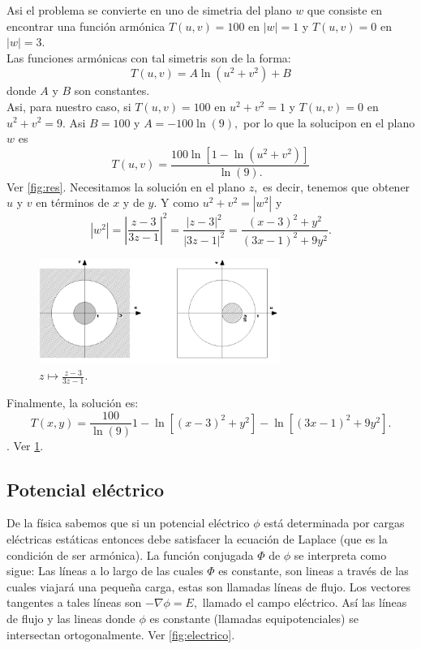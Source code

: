 \documentclass[a4paper]{article}
\begin{document}
Asi el problema se convierte en uno de simetria del plano $w$ que consiste en encontrar una función armónica $T(u,v)=100$ en $|w|=1$ y $T(u,v)=0$ en $|w|=3.$\\
Las funciones armónicas con tal simetris son de la forma: $$
T(u,v)=A\ln(u^{2}+v^{2})+B
$$ donde $A$ y $B$ son constantes.\\
Asi, para nuestro caso, si $T(u,v)=100$ en $u^{2}+v^{2}=1$ y $T(u,v)=0$ en $u^{2}+v^{2}=9.$ Asi $B=100$ y $A=-100 \ln(9),$ por lo que la solucipon en el plano $w$ es $$
T(u,v)=\frac{100 \ln[1-\ln(u^{2}+v^{2})]}{\ln(9).}
$$ Ver \ref{fig:res}.
Necesitamos la solución en el plano $z,$ es decir, tenemos que obtener $u$ y $v$ en términos de $x$ y de $y.$ Y como $u^{2}+v^{2}=|w^{2}|$ y $$
|w^{2}|=|\frac{z-3}{3z-1}|^{2}
=\frac{|z-3|^{2}}{|3z-1|^{2}}
=\frac{(x-3)^{2}+y^{2}}{(3x-1)^{2}+9y^{2}}.
$$
\begin{figure}
\centering
\includegraphics[width=0.7\textwidth]{fig4.png}
\caption{\label{fig:fig2} $z\mapsto \frac{z-3}{3z-1}$.}
\end{figure}

Finalmente, la solución es:$$
T(x,y)=\frac{100}{\ln(9)} {1-\ln[(x-3)^{2}+y^{2}]-\ln[(3x-1)^{2}+9y^{2}]}.
$$. Ver \ref{fig:fig2}. \\

\subsection{Potencial eléctrico}
De la física sabemos que si un potencial eléctrico $\phi$ está determinada por cargas eléctricas estáticas entonces debe satisfacer la ecuación de Laplace (que es la condición de ser armónica). La función conjugada $\Phi$ de $\phi$ se interpreta como sigue: Las líneas a lo largo de las cuales $\Phi$ es constante, son lineas a través de las cuales viajará una pequeña carga, estas son llamadas líneas de flujo. Los vectores tangentes a tales líneas son $-\nabla \phi=E,$ llamado el campo eléctrico. Así las líneas de flujo y las lineas donde $\phi$ es constante (llamadas equipotenciales) se intersectan ortogonalmente. Ver \ref{fig:electrico}.\\
\end{document}

